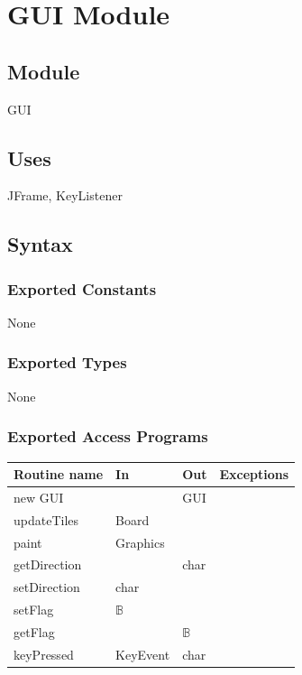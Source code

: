 \documentclass[12pt]{article}
\begin{document}
\newpage


\section* {GUI Module}

\subsection*{Module}

GUI

\subsection* {Uses}

JFrame, KeyListener

\subsection* {Syntax}

\subsubsection* {Exported Constants}

None

\subsubsection* {Exported Types}

None

\subsubsection* {Exported Access Programs}

\begin{tabular}{| l | l | l | p{5cm} |}
\hline
\textbf{Routine name} & \textbf{In} & \textbf{Out} & \textbf{Exceptions}\\
\hline
new GUI & & GUI & ~\\
\hline
updateTiles & Board & & ~\\
\hline
paint & Graphics & & ~\\
\hline
getDirection & & char &~\\
\hline
setDirection & char & &~\\
\hline
setFlag & $\mathbb{B}$ & & ~\\
\hline
getFlag & & $\mathbb{B}$ & ~\\
\hline
keyPressed & KeyEvent & char &~\\
\hline
\end{tabular}
\end{document}
